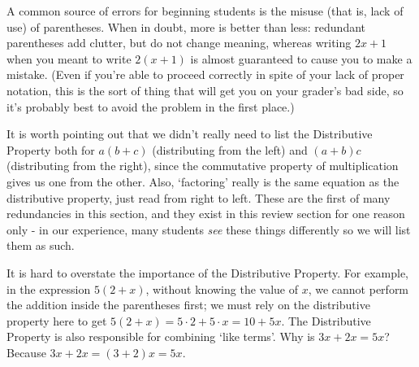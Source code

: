 \medskip


\medskip

 A common source of errors for beginning students is the misuse (that is, lack of use) of parentheses. When in doubt, more is better than less: redundant parentheses add clutter, but do not change meaning, whereas writing $2x+1$ when you meant to write $2(x+1)$ is almost guaranteed to cause you to make a mistake. (Even if you're able to proceed correctly in spite of your lack of proper notation, this is the sort of thing that will get you on your grader's bad side, so it's probably best to avoid the problem in the first place.)

\medskip


It is worth pointing out that we didn't really need to list the Distributive Property both for $a(b+c)$ (distributing from the left) and $(a+b)c$ (distributing from the right), since the commutative property of multiplication gives us one from the other.  Also, `factoring' really is the same equation as the distributive property, just read from right to left. These are the first of many redundancies in this section, and they exist in this review section for one reason only - in our experience, many students \textit{see} these things differently so we will list them as such.   

\smallskip

It is hard to overstate the importance of the Distributive Property.  For example, in the expression $5(2+x)$, without knowing the value of $x$, we cannot perform the addition inside the parentheses first;  we must rely on the distributive property here to get  $5(2+x) = 5\cdot 2 + 5 \cdot x = 10 + 5x$.  The Distributive Property is also responsible for combining `like terms'.  Why is $3x + 2x = 5x$?  Because  $3x + 2x = (3+2)x = 5x$.  

